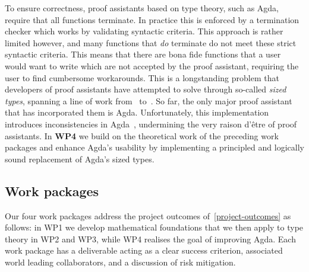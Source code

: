 \documentclass[a4paper,11pt]{article}
\let\oldcite\cite
\renewcommand*\cite[1]{{\protect\NoHyper\oldcite{#1}\protect\endNoHyper}}
\begin{document}
To ensure correctness, proof assistants based on type theory, such as Agda, require that all functions terminate. In practice this is enforced by a termination checker which works by validating syntactic criteria. This approach is rather limited however, and many
functions that \emph{do} terminate do not meet these strict syntactic criteria. This means that there are bona fide functions that a user would want to write which are not accepted by the proof assistant, requiring the user to find cumbersome workarounds.
%
This is a longstanding problem that developers of proof assistants have attempted to solve through so-called \emph{sized types}, spanning a line of work from~\cite{HughesParetoSabry1996} to~\cite{ChanLiBowman2023}. So far, the only major proof assistant that has incorporated them is Agda. Unfortunately, this %
implementation introduces inconsistencies in Agda~\cite{Agda-sized-types-unsound}, undermining the very raison d'\^etre of proof assistants.
In \textbf{WP4} we build on the theoretical work of the preceding work packages and enhance Agda's usability by implementing a principled and logically sound replacement of Agda's %
sized types.
%



\subsection{Work packages}\label{work-packages}

Our four work packages address the project outcomes of~\cref{project-outcomes} as follows: in {WP1} we develop mathematical foundations that we then apply to type theory in {WP2} and {WP3}, while {WP4} realises the goal of improving Agda.
%
%
Each work package has a deliverable acting as a clear success criterion, associated world leading collaborators, and a discussion of risk mitigation.


\end{document}
